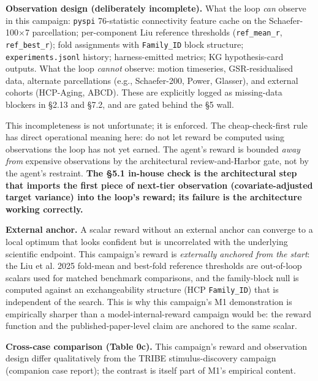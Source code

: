 \documentclass[11pt,letterpaper]{report}
\begin{document}
\textbf{Observation design (deliberately incomplete).} What the loop \emph{can} observe in this campaign: \texttt{pyspi} 76-statistic connectivity feature cache on the Schaefer-100$\times$7 parcellation; per-component Liu reference thresholds (\texttt{ref\_mean\_r}, \texttt{ref\_best\_r}); fold assignments with \texttt{Family\_ID} block structure; \texttt{experiments.jsonl} history; harness-emitted metrics; KG hypothesis-card outputs. What the loop \emph{cannot} observe: motion timeseries, GSR-residualised data, alternate parcellations (e.g., Schaefer-200, Power, Glasser), and external cohorts (HCP-Aging, ABCD). These are explicitly logged as missing-data blockers in \S2.13 and \S7.2, and are gated behind the \S5 wall.

This incompleteness is not unfortunate; it is enforced. The cheap-check-first rule has direct operational meaning here: do not let reward be computed using observations the loop has not yet earned. The agent's reward is bounded \emph{away from} expensive observations by the architectural review-and-Harbor gate, not by the agent's restraint. \textbf{The \S5.1 in-house check is the architectural step that imports the first piece of next-tier observation (covariate-adjusted target variance) into the loop's reward; its failure is the architecture working correctly.}

\textbf{External anchor.} A scalar reward without an external anchor can converge to a local optimum that looks confident but is uncorrelated with the underlying scientific endpoint. This campaign's reward is \emph{externally anchored from the start}: the Liu et al. 2025 fold-mean and best-fold reference thresholds are out-of-loop scalars used for matched benchmark comparisons, and the family-block null is computed against an exchangeability structure (HCP \texttt{Family\_ID}) that is independent of the search. This is why this campaign's M1 demonstration is empirically sharper than a model-internal-reward campaign would be: the reward function and the published-paper-level claim are anchored to the same scalar.

\textbf{Cross-case comparison (Table 0c).} This campaign's reward and observation design differ qualitatively from the TRIBE stimulus-discovery campaign (companion case report); the contrast is itself part of M1's empirical content.
\end{document}
